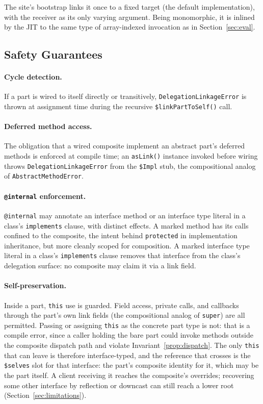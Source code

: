 \documentclass[acmsmall,nonacm]{acmart}
\theoremstyle{acmplain}
\theoremstyle{acmdefinition}
\newcommand{\code}[1]{\texttt{#1}}
\begin{document}
The site's bootstrap links it once to a fixed target (the default implementation),
with the receiver as its only varying argument. Being
monomorphic, it is inlined by the JIT to the same type of array-indexed
invocation as in Section~\ref{sec:eval}.

\subsection{Safety Guarantees}

\paragraph{Cycle detection.}
If a part is wired to itself directly or transitively,
\code{De\-le\-ga\-tion\-Link\-age\-Er\-ror} is thrown at assignment time during
the recursive \code{\$linkPartToSelf()} call.

\paragraph{Deferred method access.}
The obligation that a wired composite implement an abstract part's deferred methods is enforced at compile time; an \code{asLink()} instance invoked before wiring throws \code{DelegationLinkageError} from the \code{\$Impl} stub, the compositional analog of \code{AbstractMethodError}.

\paragraph{\code{@internal} enforcement.}
\code{@internal} may annotate an interface method or an interface type literal
in a class's \code{implements} clause, with distinct effects. A marked method has its calls confined to the composite, the intent behind \code{protected} in implementation inheritance, but more cleanly scoped for composition. A marked
interface type literal in a class's \code{implements}
clause removes that interface from the class's delegation surface: no composite may claim it via a link field.

\paragraph{Self-preservation.}
Inside a part, \code{this} use is guarded. Field access, private calls,
and callbacks through the part's own link fields (the compositional
analog of \code{super}) are all permitted. Passing or assigning \code{this} as
the concrete part type is not: that is a compile error, since a caller
holding the bare part could invoke methods outside the composite dispatch
path and violate Invariant~\ref{prop:dispatch}. The only \code{this} that can
leave is therefore interface-typed, and the reference that crosses is the
\code{\$selves} slot for that interface: the part's composite identity for
it, which may be the part itself. A client receiving it reaches the
composite's overrides; recovering some other interface by reflection or
downcast can still reach a lower root (Section~\ref{sec:limitations}).
\end{document}
